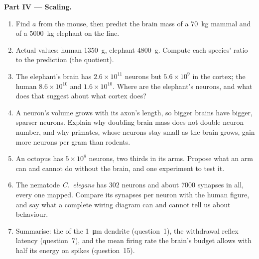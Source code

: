 \begin{problem}
\medskip
\noindent\textbf{Part IV --- Scaling.}
\begin{enumerate}[resume]
  \item Find $a$ from the mouse, then predict the brain mass of a
        \qty{70}{kg} mammal and of a \qty{5000}{kg} elephant on the
        line.
  \item Actual values: human \qty{1350}{g}, elephant \qty{4800}{g}.
        Compute each species' ratio to the prediction (the
         quotient).
  \item The elephant's brain has $2.6\times 10^{11}$ neurons but
        $5.6\times 10^{9}$ in the cortex; the human $8.6\times 10^{10}$
        and $1.6\times 10^{10}$. Where are the elephant's neurons, and
        what does that suggest about what cortex does?
  \item A neuron's volume grows with its axon's length, so bigger
        brains have bigger, sparser neurons. Explain why doubling brain
        mass does not double neuron number, and why primates, whose
        neurons stay small as the brain grows, gain more neurons per
        gram than rodents.
  \item An octopus has $5\times 10^{8}$ neurons, two thirds in its arms.
        Propose what an arm can and cannot do without the brain, and
        one experiment to test it.
  \item The nematode \emph{C.~elegans} has $302$ neurons and about
        \num{7000} synapses in all, every one mapped. Compare its
        synapses per neuron with the human figure, and say what a
        complete wiring diagram can and cannot tell us about behaviour.
  \item Summarise: the  of the \qty{1}{\micro m} dendrite
        (question~1), the withdrawal reflex latency (question~7), and
        the mean firing rate the brain's budget allows with half its
        energy on spikes (question~15).
\end{enumerate}
\end{problem}
